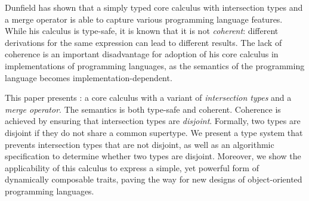Dunfield has shown that a simply typed core calculus with intersection types and
a merge operator is able to capture various programming language features. While
his calculus is type-safe, it is known that it is not \emph{coherent}:
different derivations for the same expression can lead to different results. The
lack of coherence is an important disadvantage for adoption of his core calculus
in implementations of programming languages, as the semantics of the programming
language becomes implementation-dependent.

This paper presents \name: a core calculus with a variant of \emph{intersection
types} and a \emph{merge operator}. The semantics \name is both type-safe and
coherent. Coherence is achieved by ensuring that intersection types are
\emph{disjoint}. Formally, two types are disjoint if they do not share a common
supertype.
 We present a type system that prevents intersection types that are
not disjoint, as well as an algorithmic specification to determine whether two
types are disjoint. Moreover, we show the applicability of this calculus to
express a simple, yet powerful form of dynamically composable traits, paving the way for new
designs of object-oriented programming languages.
